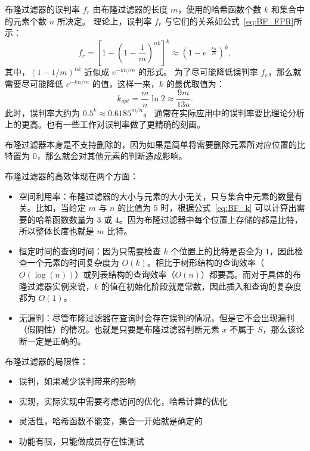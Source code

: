 布隆过滤器的误判率 $f_r$ 由布隆过滤器的长度 $m$，使用的哈希函数个数 $k$ 和集合中的元素个数 $n$ 所决定。
理论上，误判率 $f_r$ 与它们的关系如公式~\eqref{eq:BF_FPR}所示：
\begin{equation}
    f_r = \left[ 1 - \left( 1 - \frac{1}{m} \right)^{nk} \right]^k \approx \left(1 - e^{-\frac{kn}m{}}\right)^k,
    \label{eq:BF_FPR}
\end{equation}
其中，$(1-1/m)^{nk}$ 近似成 $e^{-kn/m}$ 的形式。
为了尽可能降低误判率 $f_r$，那么就需要尽可能降低 $e^{-kn/m}$ 的值，这样一来，$k$ 的最优取值为：
\begin{equation}
    k_{opt}= \frac{m}{n}\ln 2 \approx \frac{9m}{13n}.
    \label{eq:BF_k}
\end{equation}
此时，误判率大约为 $0.5^k\approx 0.6185^{m/n}$。
通常在实际应用中的误判率要比理论分析上的更高。也有一些工作对误判率做了更精确的刻画。

布隆过滤器本身是不支持删除的，因为如果是简单将需要删除元素所对应位置的比特置为 $0$，那么就会对其他元素的判断造成影响。

布隆过滤器的高效体现在两个方面：
\begin{itemize}
    \item 空间利用率：布隆过滤器的大小与元素的大小无关，只与集合中元素的数量有关。比如，当给定 $m$ 与 $n$ 的比值为 $5$ 时，根据公式~\eqref{eq:BF_k} 可以计算出需要的哈希函数数量为 $3$ 或 $4$。因为布隆过滤器中每个位置上存储的都是比特，所以整体长度也就是 $m$ 比特。
    \item 恒定时间的查询时间：因为只需要检查 $k$ 个位置上的比特是否全为 $1$，因此检查一个元素的时间复杂度为 $O(k)$。相比于树形结构的查询效率（$O(\log(n))$）或列表结构的查询效率（$O(n)$）都要高。而对于具体的布隆过滤器实例来说，$k$ 的值在初始化阶段就是常数，因此插入和查询的复杂度都为 $O(1)$。
    \item 无漏判：尽管布隆过滤器在查询时会存在误判的情况，但是它不会出现漏判（假阴性）的情况。也就是只要是布隆过滤器判断元素 $x$ 不属于 $S$，那么该论断一定是正确的。
\end{itemize}

布隆过滤器的局限性：
\begin{itemize}
    \item 误判，如果减少误判带来的影响
    \item 实现，实际实现中需要考虑访问的优化，哈希计算的优化
    \item 灵活性，哈希函数不能变，集合一开始就是确定的
    \item 功能有限，只能做成员存在性测试
\end{itemize}

